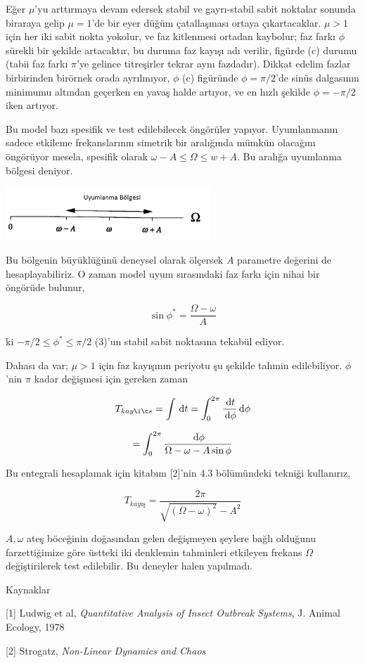 \documentclass[12pt,fleqn]{article}\usepackage{../../common}
\begin{document}
Eğer $\mu$'yu arttırmaya devam edersek stabil ve gayrı-stabil sabit noktalar
sonunda biraraya gelip $\mu=1$'de bir eyer düğüm çatallaşması ortaya
çıkartacaklar. $\mu>1$ için her iki sabit nokta yokolur, ve faz kitlenmesi
ortadan kaybolur; faz farkı $\phi$ sürekli bir şekilde artacaktır, bu duruma faz
kayışı adı verilir, figürde (c) durumu (tabii faz farkı $\pi$'ye gelince
titreşirler tekrar aynı fazdadır). Dikkat edelim fazlar birbirinden birörnek
orada ayrılmıyor, $\phi$ (c) figüründe $\phi=\pi/2$'de sinüs dalgasının minimumu
altından geçerken en yavaş halde artıyor, ve en hızlı şekilde $\phi=-\pi/2$ iken
artıyor.

Bu model bazı spesifik ve test edilebilecek öngörüler yapıyor. Uyumlanmanın
sadece etkileme frekanslarının simetrik bir aralığında mümkün olacağını
öngörüyor mesela, spesifik olarak $\omega - A \le \Omega \le w + A$. Bu aralığa
uyumlanma bölgesi deniyor.

\includegraphics[height=2cm]{04_16.png}

Bu bölgenin büyüklüğünü deneysel olarak ölçersek $A$ parametre değerini de
hesaplayabiliriz. O zaman model uyum sırasındaki faz farkı için nihai bir
öngörüde bulunur,

$$ \sin\phi^\ast = \frac{\Omega-\omega}{A} $$

ki $-\pi/2 \le \phi^\ast \le \pi/2$ (3)'un stabil sabit noktasına tekabül ediyor.

Dahası da var; $\mu > 1$ için faz kayışının periyotu şu şekilde tahmin
edilebiliyor. $\phi$'nin $\pi$ kadar değişmesi için gereken zaman

$$ T_{kayış} =
\int \ud t = \int_{0}^{2\pi} \frac{\ud t}{\ud \phi} \ud \phi $$

$$
= \int_{0}^{2\pi} \frac{\,\mathrm{d} \phi}{\Omega - \omega - A\sin\phi}
$$

Bu entegrali hesaplamak için kitabım [2]'nin 4.3 bölümündeki tekniği kullanırız,

$$ T_{kayış} = \frac{2\pi}{\sqrt{(\Omega-\omega)^2} - A^2} $$

$A,\omega$ ateş böceğinin doğasından gelen değişmeyen şeylere bağlı olduğunu
farzettiğimize göre üstteki iki denklemin tahminleri etkileyen frekans $\Omega$
değiştirilerek test edilebilir. Bu deneyler halen yapılmadı. 

Kaynaklar

[1] Ludwig et al, {\em Quantitative Analysis of Insect Outbreak Systems},
J. Animal Ecology, 1978

[2] Strogatz, {\em Non-Linear Dynamics and Chaos}
\end{document}

